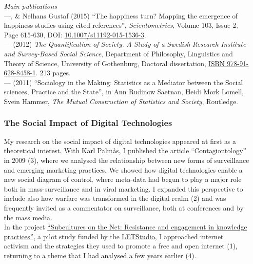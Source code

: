 \documentclass[a4paper,11pt,oneside]{article}
\begin{document}

      \noindent  \emph{Main publications} \\
      ---, \& Nelhans Gustaf (2015) ``The happiness turn? Mapping the emergence of happiness studies using cited references'', \emph{Scientometrics}, Volume 103, Issue 2, Page 615-630, DOI: \href{http://dx.doi.org/10.1007/s11192-015-1536-3}{10.1007/s11192-015-1536-3}.\\
      --- (2012) \emph{The Quantification of Society. A Study of a Swedish Research Institute
      and Survey-Based Social Science}, Department of Philosophy, Linguistics and Theory of Science, University of Gothenburg, Doctoral dissertation,  \href{https://gupea.ub.gu.se/handle/2077/28807}{ISBN 978-91-628-8458-1}. 213 pages.\\
      --- (2011) ``Sociology in the Making: Statistics as a Mediator between the Social sciences, Practice and the State'', in Ann Rudinow Saetnan, Heidi Mork Lomell, Svein Hammer, \emph{The Mutual Construction of Statistics and Society}, Routledge.\\


    \subsubsection{The Social Impact of Digital Technologies}
    My research on the social impact of digital technologies appeared at first as a theoretical
    interest. With Karl Palmås, I published the article ``Contagiontology'' in 2009 (3),
    where we analysed the relationship between new forms of surveillance and emerging
    marketing practices. We showed how digital technologies enable a new social diagram
    of control, where meta-data had begun to play a major role both in mass-surveillance
    and in viral marketing. I expanded this perspective to include also how warfare
    was transformed in the digital realm (2) and was frequently invited as a commentator
    on surveillance, both at conferences and by the mass media.\\

    In the project \href{http://letstudio.gu.se/studio-2/subcultures-on-the-net}{``Subcultures on the Net: Resistance and engagement in knowledge practices''},
    a pilot study funded by the \href{http://letstudio.gu.se/}{LETStudio}, I
    approached internet activism and the strategies they used to promote a free and
    open internet (1), returning to a theme that I had analysed a few years earlier (4).\\
\end{document}
